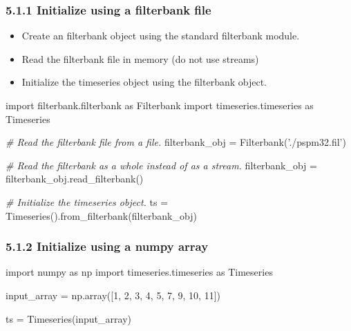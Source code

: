 \documentclass[]{article}
\newenvironment{Shaded}{}{}
\newcommand{\DecValTok}[1]{\textcolor[rgb]{0.25,0.63,0.44}{#1}}
\newcommand{\StringTok}[1]{\textcolor[rgb]{0.25,0.44,0.63}{#1}}
\newcommand{\ImportTok}[1]{#1}
\newcommand{\CommentTok}[1]{\textcolor[rgb]{0.38,0.63,0.69}{\textit{#1}}}
\newcommand{\OperatorTok}[1]{\textcolor[rgb]{0.40,0.40,0.40}{#1}}
\newcommand{\NormalTok}[1]{#1}
\providecommand{\tightlist}{%
  \setlength{\itemsep}{0pt}\setlength{\parskip}{0pt}}
\begin{document}
\subsubsection{5.1.1 Initialize using a filterbank
file}\label{initialize-using-a-filterbank-file}

\begin{itemize}
\tightlist
\item
  Create an filterbank object using the standard filterbank module.
\item
  Read the filterbank file in memory (do not use streams)
\item
  Initialize the timeseries object using the filterbank object.
\end{itemize}

\begin{Shaded}
\begin{Highlighting}[]
\ImportTok{import}\NormalTok{ filterbank.filterbank }\ImportTok{as}\NormalTok{ Filterbank}
\ImportTok{import}\NormalTok{ timeseries.timeseries }\ImportTok{as}\NormalTok{ Timeseries}

\CommentTok{# Read the filterbank file from a file. }
\NormalTok{filterbank_obj }\OperatorTok{=}\NormalTok{ Filterbank(}\StringTok{'./pspm32.fil'}\NormalTok{)}

\CommentTok{# Read the filterbank as a whole instead of as a stream. }
\NormalTok{filterbank_obj }\OperatorTok{=}\NormalTok{  filterbank_obj.read_filterbank()}

\CommentTok{# Initialize the timeseries object. }
\NormalTok{ts }\OperatorTok{=}\NormalTok{ Timeseries().from_filterbank(filterbank_obj)}
\end{Highlighting}
\end{Shaded}

\subsubsection{5.1.2 Initialize using a numpy
array}\label{initialize-using-a-numpy-array}

\begin{Shaded}
\begin{Highlighting}[]
\ImportTok{import}\NormalTok{ numpy }\ImportTok{as}\NormalTok{ np}
\ImportTok{import}\NormalTok{ timeseries.timeseries }\ImportTok{as}\NormalTok{ Timeseries}

\NormalTok{input_array }\OperatorTok{=}\NormalTok{ np.array([}\DecValTok{1}\NormalTok{, }\DecValTok{2}\NormalTok{, }\DecValTok{3}\NormalTok{, }\DecValTok{4}\NormalTok{, }\DecValTok{5}\NormalTok{, }\DecValTok{7}\NormalTok{, }\DecValTok{9}\NormalTok{, }\DecValTok{10}\NormalTok{, }\DecValTok{11}\NormalTok{])}

\NormalTok{ts }\OperatorTok{=}\NormalTok{ Timeseries(input_array)}
\end{Highlighting}
\end{Shaded}
\end{document}
